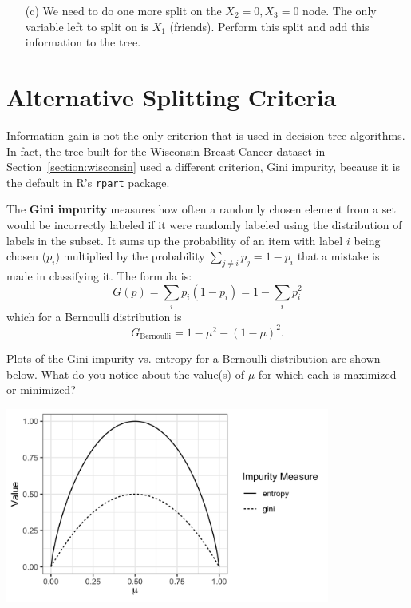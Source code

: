 \begin{question}{}
\begin{enumerate}
\item[(c)] We need to do one more split on the $X_2 = 0, X_3 = 0$ node. The only variable left to split on is $X_1$ (friends). Perform this split and add this information to the tree. 
\end{enumerate}
\end{question}


\section{Alternative Splitting Criteria}

Information gain is not the only criterion that is used in decision tree algorithms. In fact, the tree built for the Wisconsin Breast Cancer dataset in Section~\ref{section:wisconsin} used a different criterion, Gini impurity, because it is the default in R's \texttt{rpart} package. 

The \textbf{Gini impurity} measures how often a randomly chosen element from a set would be incorrectly labeled if it were randomly labeled using the distribution of labels in the subset. It sums up the probability of an item with label $i$ being chosen ($p_i$) multiplied by the probability $\sum_{j \neq i} p_j = 1 - p_i$ that a mistake is made in classifying it. The formula is:
$$ G(p) = \sum_{i} p_i (1 - p_i) = 1 - \sum_i p_i^2 $$
which for a Bernoulli distribution is 
$$ G_\text{Bernoulli} = 1 - \mu^2 - (1-\mu)^2. $$

\begin{question}{}
Plots of the Gini impurity vs. entropy for a Bernoulli distribution are shown below. What do you notice about the value(s) of $\mu$ for which each is maximized or minimized?
\begin{center}
\includegraphics[width=0.8\textwidth]{img/comparison-entropy-gini-bernoulli.png}
\end{center}
\end{question}

